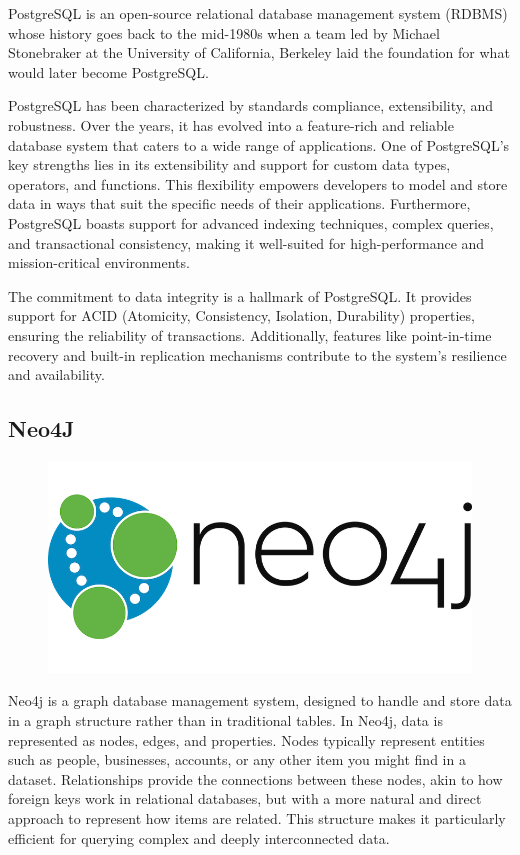 PostgreSQL is an open-source relational database management system (RDBMS) whose history goes back to the mid-1980s when a team led by Michael Stonebraker at the University of California, Berkeley laid the foundation for what would later become PostgreSQL.

PostgreSQL has been characterized by standards compliance, extensibility, and robustness. Over the years, it has evolved into a feature-rich and reliable database system that caters to a wide range of applications. One of PostgreSQL's key strengths lies in its extensibility and support for custom data types, operators, and functions. This flexibility empowers developers to model and store data in ways that suit the specific needs of their applications. Furthermore, PostgreSQL boasts support for advanced indexing techniques, complex queries, and transactional consistency, making it well-suited for high-performance and mission-critical environments.

The commitment to data integrity is a hallmark of PostgreSQL. It provides support for ACID (Atomicity, Consistency, Isolation, Durability) properties, ensuring the reliability of transactions. Additionally, features like point-in-time recovery and built-in replication mechanisms contribute to the system's resilience and availability.

\subsection*{Neo4J}

\begin{figure}
\begin{center}
\includegraphics[height=.5in]{neo4jlogo.png}
\end{center}
\end{figure}

Neo4j is a graph database management system, designed to handle and store data in a graph structure rather than in traditional tables. In Neo4j, data is represented as nodes, edges, and properties. Nodes typically represent entities such as people, businesses, accounts, or any other item you might find in a dataset. Relationships provide the connections between these nodes, akin to how foreign keys work in relational databases, but with a more natural and direct approach to represent how items are related. This structure makes it particularly efficient for querying complex and deeply interconnected data.

